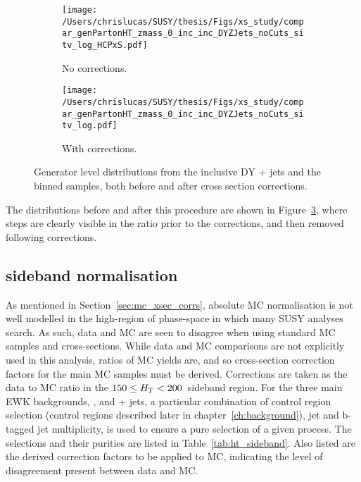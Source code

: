 \begin{figure}[b!]
  \centering
  \begin{subfigure}[b]{0.48\textwidth}
    \texttt{[image: /Users/chrislucas/SUSY/thesis/Figs/xs\_study/compar\_genPartonHT\_zmass\_0\_inc\_inc\_DYZJets\_noCuts\_sitv\_log\_HCPxS.pdf]}
    \caption{No corrections.}
    \label{fig:xsec_study_before}
  \end{subfigure}             
  \begin{subfigure}[b]{0.48\textwidth}
    \texttt{[image: /Users/chrislucas/SUSY/thesis/Figs/xs\_study/compar\_genPartonHT\_zmass\_0\_inc\_inc\_DYZJets\_noCuts\_sitv\_log.pdf]}
    \caption{With corrections.}
    \label{fig:xsec_study_after}
  \end{subfigure}             
  \caption{Generator level \HTpart distributions from the
    inclusive DY + jets and the \HTpart binned \zj
    samples, both before and after cross section corrections.}
  \label{fig:xsec_study}
\end{figure}

The \HTpart distributions before and after this procedure are shown in
Figure~\ref{fig:xsec_study}, where steps are clearly visible in the
ratio prior to the corrections, and then removed following corrections.


\subsection{\HT sideband normalisation}

As mentioned in Section~\ref{sec:mc_xsec_corrs}, absolute MC 
normalisation is not well modelled in the high-\met region of 
phase-space in which many SUSY analyses search. As such, data and MC are seen to
disagree when using standard MC samples and cross-sections. While data and MC
comparisons are not explicitly used in this analysis, ratios of MC yields are, 
and so cross-section correction factors for the main 
MC samples must be derived. Corrections are taken as the data to MC ratio
in the $150 \leq H_T < 200$~\gev sideband region. For the three main EWK backgrounds,
\wj, \zj and \ttbar + jets, a particular combination of control region selection (control regions described
later in chapter~\ref{ch:background}), jet and b-tagged jet multiplicity, is used to ensure
a pure selection of a given process. The selections and their purities are listed in 
Table~\ref{tab:ht_sideband}. Also listed are the derived correction factors to
be applied to MC, indicating the level of disagreement present between data and MC.

